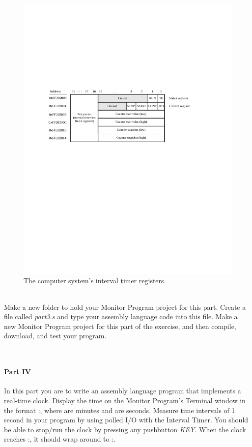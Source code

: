 \documentclass[epsfig,10pt,fullpage]{article}
\begin{document}
\begin{figure}[htb]
	\begin{center}
	\includegraphics[scale=0.8]{figures/DE0_Nano_SoC/fig_interval_port.pdf}
	\end{center}
	\caption{The computer system's interval timer registers.}
\label{fig:timer2}
\end{figure}

~\\
\noindent
Make a new folder to hold your Monitor Program project for this part. Create a
file called {\it part3.s} and type your assembly language code into this file.
Make a new Monitor Program project for this part of the exercise, and then compile, download, 
and test your program. 

~\\
~\\
\noindent
{\bf Part IV}
~\\
~\\
\noindent
In this part you are to write an assembly language program that implements a real-time clock. 
Display the time on the Monitor Program's Terminal window in the format 
:, where  are minutes and  are seconds.
Measure time intervals of 1 second in your program by using polled I/O with the Interval Timer.
You should be able to stop/run the clock by pressing any pushbutton {\it KEY}. 
When the clock reaches :, it should wrap around to :.
\end{document}
